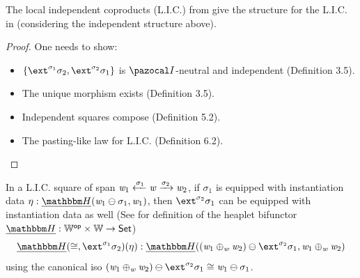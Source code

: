 \begin{lemma}
    The local independent coproducts (L.I.C.) from \textcite{kammar2017monad} give the structure for the L.I.C. in \textcite{simpson2018category} (considering the independent structure above). 
\end{lemma}
\begin{proof}
    One needs to show: 
    \begin{itemize} 
        \item $\{ \ext^{\sigma_1}\sigma_2, \ext^{\sigma_2}\sigma_1 \}$ is $\mcatI$-neutral and independent (Definition 3.5).
        \item The unique morphism exists (Definition 3.5).
        \item Independent squares compose (Definition 5.2).
        \item The pasting-like law for L.I.C. (Definition 6.2).
    \end{itemize}
\end{proof}

\begin{remark}\label{rem:local-ind-coproducts-W-data}
In a L.I.C. square of span $\mathit{w}_1 \xleftarrow{\sigma_1} \mathit{w} \xrightarrow{\sigma_2} \mathit{w}_2$,
if $\sigma_1$ is equipped with instantiation data $\mvarM : \dheapF(\vw_1 \ominus \sigma_1, \vw_1)$,
then $\ext^{\sigma_2}\sigma_1$ can be equipped with instantiation data as well (See \cite{kammar2017monad} for definition of the heaplet bifunctor $\dheapF : \opC\worldC \times \worldC \to \setC$)
\[ \dheapF(\iso, \ext^{\sigma_1}\sigma_2)(\mvarM) : \dheapF((\vw_1 \liplus\vw \vw_2) \ominus \ext^{\sigma_2}\sigma_1, \vw_1 \liplus\vw \vw_2) \]
using the canonical iso $(\vw_1 \liplus\vw \vw_2) \ominus \ext^{\sigma_2}\sigma_1 \iso \vw_1 \ominus \sigma_1$.
\end{remark}
